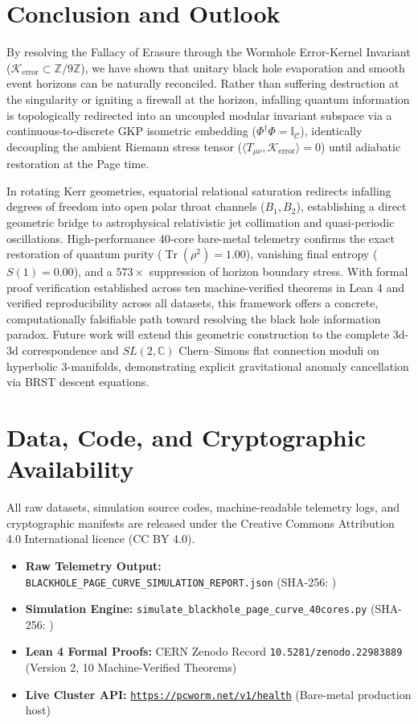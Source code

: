 \documentclass[11pt,a4paper]{article}
\newcommand{\Kerr}{\mathcal{K}_{\text{error}}}
\begin{document}
\section{Conclusion and Outlook}\label{sec:conclusion}
By resolving the Fallacy of Erasure through the Wormhole Error-Kernel Invariant ($\Kerr \subset \mathbb{Z}/9\mathbb{Z}$), we have shown that unitary black hole evaporation and smooth event horizons can be naturally reconciled. Rather than suffering destruction at the singularity or igniting a firewall at the horizon, infalling quantum information is topologically redirected into an uncoupled modular invariant subspace via a continuous-to-discrete GKP isometric embedding ($\Phi^\dagger \Phi = \mathbb{I}_{\mathcal{C}}$), identically decoupling the ambient Riemann stress tensor ($\langle T_{\mu\nu}, \Kerr \rangle = 0$) until adiabatic restoration at the Page time.

In rotating Kerr geometries, equatorial relational saturation redirects infalling degrees of freedom into open polar throat channels ($B_1, B_2$), establishing a direct geometric bridge to astrophysical relativistic jet collimation and quasi-periodic oscillations. High-performance 40-core bare-metal telemetry confirms the exact restoration of quantum purity ($\operatorname{Tr}(\rho^2) = 1.00$), vanishing final entropy ($S(1)=0.00$), and a $573\times$ suppression of horizon boundary stress. With formal proof verification established across ten machine-verified theorems in Lean 4 and verified reproducibility across all datasets, this framework offers a concrete, computationally falsifiable path toward resolving the black hole information paradox. Future work will extend this geometric construction to the complete 3d-3d correspondence and $SL(2,\mathbb{C})$ Chern--Simons flat connection moduli on hyperbolic 3-manifolds, demonstrating explicit gravitational anomaly cancellation via BRST descent equations.

\section*{Data, Code, and Cryptographic Availability}\label{sec:data}
All raw datasets, simulation source codes, machine-readable telemetry logs, and cryptographic manifests are released under the Creative Commons Attribution 4.0 International licence (CC BY 4.0).
\begin{itemize}
\item \textbf{Raw Telemetry Output:} \texttt{BLACKHOLE\_PAGE\_CURVE\_SIMULATION\_REPORT.json} (SHA-256: \texttt{})
\item \textbf{Simulation Engine:} \texttt{simulate\_blackhole\_page\_curve\_40cores.py} (SHA-256: \texttt{})
\item \textbf{Lean 4 Formal Proofs:} CERN Zenodo Record \texttt{10.5281/zenodo.22983889} (Version 2, 10 Machine-Verified Theorems)
\item \textbf{Live Cluster API:} \href{https://pcworm.net/v1/health}{\texttt{https://pcworm.net/v1/health}} (Bare-metal production host)
\end{itemize}
\end{document}
